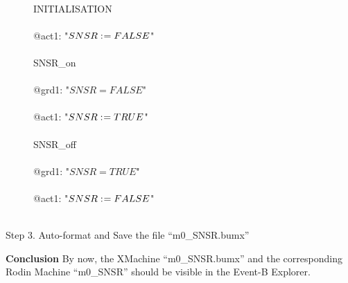 \begin{description}
\begin{center}
\begin{Bcode}
		\Bevents\\
		\Btab INITIALISATION\\
		\Btab \Bbegin\\
		\Btab \Btab @act1: "\(SNSR \mathrel{:\mkern1mu=} FALSE\)"\\
		\Btab \Bend\\
		\Btab SNSR_on\\
		\Btab \Bwhen\\
		\Btab \Btab @grd1: "\(SNSR = FALSE\)"\\
		\Btab \Bthen\\
		\Btab \Btab @act1: "\(SNSR \mathrel{:\mkern1mu=} TRUE\)"\\
		\Btab \Bend\\
		\Btab SNSR_off\\
		\Btab \Bwhen\\
		\Btab \Btab @grd1: "\(SNSR = TRUE\)"\\
		\Btab \Bthen\\
		\Btab \Btab @act1: "\(SNSR \mathrel{:\mkern1mu=} FALSE\)"\\
		\Btab \Bend\\
		\Bend
		\fi
	\end{Bcode}
\end{center}

\item[Step 3. Auto-format and Save the file ``m0\_SNSR.bumx''] 
\end{description}

\textbf{Conclusion} By now, the XMachine ``m0\_SNSR.bumx'' and the corresponding Rodin Machine ``m0\_SNSR'' should be visible in the Event-B Explorer.

